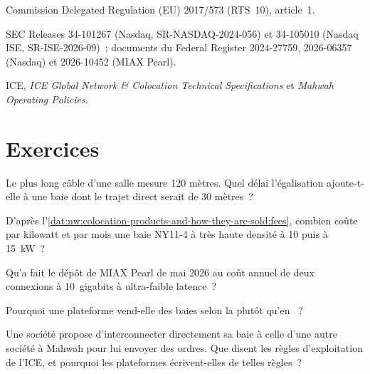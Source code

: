 \begin{omsources}
\item Commission Delegated Regulation (EU) 2017/573 (RTS~10), article~1.
\item SEC Releases 34-101267 (Nasdaq, SR-NASDAQ-2024-056) et 34-105010 (Nasdaq ISE, SR-ISE-2026-09)~; documents du Federal Register 2024-27759,
2026-06357 (Nasdaq) et 2026-10452 (MIAX Pearl).
\item ICE, \emph{ICE Global Network \& Colocation Technical Specifications} et \emph{Mahwah Operating Policies}.
\end{omsources}

\section{Exercices}

\begin{exercise}[$\star$]\label{exo:nw:colocation-products-and-how-they-are-sold:1}
Le plus long câble d'une salle mesure 120 mètres. Quel délai l'égalisation ajoute-t-elle à une baie dont le trajet direct serait de 30 mètres~?
\end{exercise}

\begin{exercise}[$\star$]\label{exo:nw:colocation-products-and-how-they-are-sold:2}
D'après l'\cref{dat:nw:colocation-products-and-how-they-are-sold:fees}, combien coûte par kilowatt et par mois une baie NY11-4 à très haute densité
à 10 puis à \qty{15}{\kilo\watt}~?
\end{exercise}

\begin{exercise}[$\star$]\label{exo:nw:colocation-products-and-how-they-are-sold:3}
Qu'a fait le dépôt de MIAX Pearl de mai 2026 au coût annuel de deux connexions à 10~gigabits à ultra-faible latence~?
\end{exercise}

\begin{exercise}[$\star\star$]\label{exo:nw:colocation-products-and-how-they-are-sold:4}
Pourquoi une plateforme vend-elle des baies selon la  plutôt qu'en ~?
\end{exercise}

\begin{exercise}[$\star\star$]\label{exo:nw:colocation-products-and-how-they-are-sold:5}
Une société propose d'interconnecter directement sa baie à celle d'une autre société à Mahwah pour lui envoyer des ordres. Que disent les règles
d'exploitation de l'ICE, et pourquoi les plateformes écrivent-elles de telles règles~?
\end{exercise}

